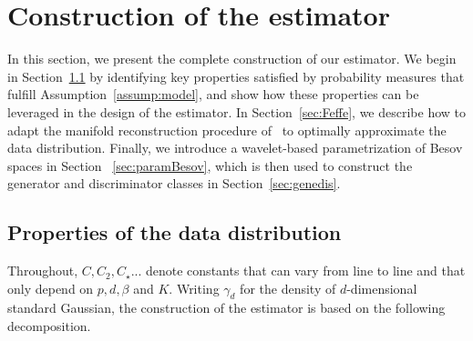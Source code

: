 \documentclass[10pt]{article}
\begin{document}
\section{Construction of the estimator}
In this section, we present the complete construction of our estimator. We begin in Section~\ref{sec:proptarget} by identifying key properties satisfied by probability measures that fulfill Assumption~\ref{assump:model}, and show how these properties can be leveraged in the design of the estimator. In Section~\ref{sec:Feffe}, we describe how to adapt the manifold reconstruction procedure of~\cite{fefferman2015reconstruction} to optimally approximate the data distribution. Finally, we introduce a wavelet-based parametrization of Besov spaces in Section ~\ref{sec:paramBesov}, which is then used to construct the generator and discriminator classes in Section~\ref{sec:genedis}.



\subsection{Properties of the data distribution}\label{sec:proptarget}
Throughout, $C, C_2,C_\star...$ denote constants that can vary from line to line and that only depend on $p,d,\beta$ and $K$.
Writing $\gamma_d$ for the density of $d$-dimensional standard Gaussian, the construction of the estimator is based on the following decomposition.
\end{document}
